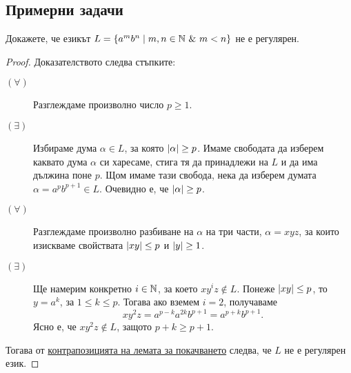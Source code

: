 \subsection{Примерни задачи}

\begin{extra}
\begin{problem}
  Докажете, че езикът $L = \{a^mb^n \mid m,n\in \mathbb{N}\ \&\ m < n\}$ не е регулярен.
\end{problem}
\begin{proof}
  Доказателството следва стъпките:
  \begin{description}
  \item[$(\forall)$]
    Разглеждаме произволно число $p \geq 1$.
  \item[$(\exists)$]
    Избираме дума $\alpha \in L$, за която $\vert{\alpha}\vert \geq p$. Имаме свободата да изберем каквато дума $\alpha$
    си харесаме, стига тя да принадлежи на $L$ и да има дължина поне $p$.
    Щом имаме тази свобода, нека да изберем думата $\alpha = a^{p}b^{p+1} \in L$. Очевидно е, че $\vert{\alpha}\vert \geq p$.
  \item[$(\forall)$]
    Разглеждаме произволно разбиване на $\alpha$ на три части, $\alpha = xyz$,
    за които изискваме свойствата $\vert{xy}\vert \leq p$ и $\vert{y}\vert \geq 1$.
  \item[$(\exists)$]
    Ще намерим конкретно $i\in\mathbb{N}$, за което $xy^iz \not\in L$.
    Понеже $\vert{xy}\vert \leq p$, то $y = a^k$, за  $1\leq k \leq p$.
    Тогава ако вземем $i = 2$, получаваме 
    \[xy^2z = a^{p-k}a^{2k}b^{p+1} = a^{p+k}b^{p+1}.\]
    Ясно е, че $xy^2z \not\in L$, защото $p+k \geq p+1$.
  \end{description}
  Тогава от \hyperref[cor:regular:pumping]{контрапозицията на лемата за покачването} следва, че $L$ не е регулярен език.
\end{proof}


\end{extra}
